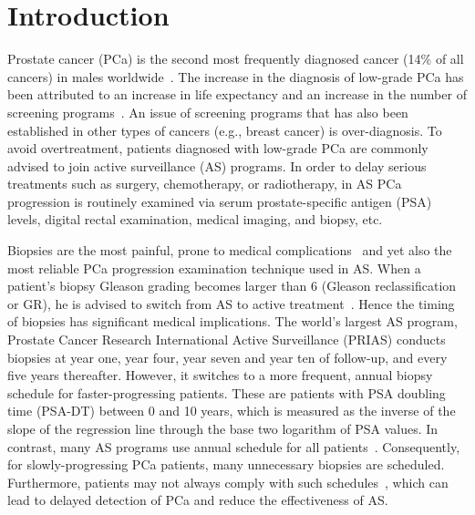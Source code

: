 \section{Introduction}
\label{c2:sec:introduction}
Prostate cancer (PCa) is the second most frequently diagnosed cancer (14\% of all cancers) in males worldwide~\citep{GlobalCancerStats2012}. The increase in the diagnosis of low-grade PCa has been attributed to an increase in life expectancy and an increase in the number of screening programs~\citep{potoskyPSAcancer}. An issue of screening programs that has also been established in other types of cancers (e.g., breast cancer) is over-diagnosis. To avoid overtreatment, patients diagnosed with low-grade PCa are commonly advised to join active surveillance (AS) programs. In order to delay serious treatments such as surgery, chemotherapy, or radiotherapy, in AS PCa progression is routinely examined via serum prostate-specific antigen (PSA) levels, digital rectal examination, medical imaging, and biopsy, etc.

Biopsies are the most painful, prone to medical complications~\citep{loeb2013systematic} and yet also the most reliable PCa progression examination technique used in AS. When a patient's biopsy Gleason grading becomes larger than 6 (Gleason reclassification or GR), he is advised to switch from AS to active treatment~\citep{bokhorst2015compliance}. Hence the timing of biopsies has significant medical implications. The world's largest AS program, Prostate Cancer Research International Active Surveillance (PRIAS) conducts biopsies at year one, year four, year seven and year ten of follow-up, and every five years thereafter. However, it switches to a more frequent, annual biopsy schedule for faster-progressing patients. These are patients with PSA doubling time (PSA-DT) between 0 and 10 years, which is measured as the inverse of the slope of the regression line through the base two logarithm of PSA values. In contrast, many AS programs use annual schedule for all patients~\citep{tosoian2011active,welty2015extended}. Consequently, for slowly-progressing PCa patients, many unnecessary biopsies are scheduled. Furthermore, patients may not always comply with such schedules~\citep{bokhorst2015compliance}, which can lead to delayed detection of PCa and reduce the effectiveness of AS.


